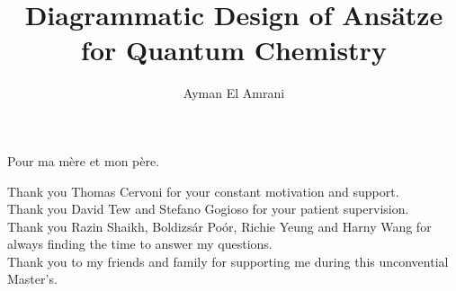 \documentclass[a4paper,nobind]{ociamthesis}  %
\title{Diagrammatic Design of Ansätze for Quantum Chemistry}
\author{Ayman El Amrani}
\begin{document}
\setlength{\textbaselineskip}{22pt}  %
\setlength{\frontmatterbaselineskip}{17pt plus1pt minus1pt} %
\setlength{\baselineskip}{\textbaselineskip}


\setcounter{secnumdepth}{1}  %
\setcounter{tocdepth}{1}  %


\begin{romanpages}
\maketitle

\begin{dedication}
Pour ma mère et mon père. \\
\end{dedication}

\begin{acknowledgements}
Thank you Thomas Cervoni for your constant motivation and support. \\
Thank you David Tew and Stefano Gogioso for your patient supervision. \\
Thank you Razin Shaikh, Boldizsár Poór, Richie Yeung and Harny Wang for always finding the time to answer my questions. \\
Thank you to my friends and family for supporting me during this unconvential Master's.
\end{acknowledgements}

\begin{abstract}
	
\end{abstract}

\flushbottom  %

\tableofcontents

\end{romanpages}











\end{document}
